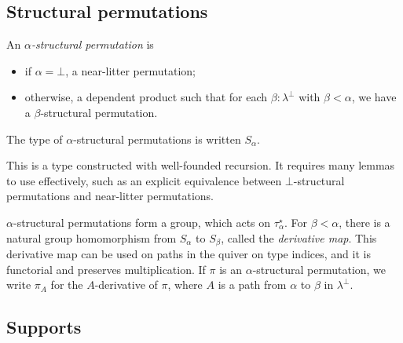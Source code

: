 \documentclass{article}
\begin{document}
\subsection{Structural permutations}

\begin{definition}
    An \emph{\( \alpha \)-structural permutation} is
    \begin{itemize}
        \item if \( \alpha = \bot \), a near-litter permutation;
        \item otherwise, a dependent product such that for each \( \beta : \lambda^\bot \) with \( \beta < \alpha \), we have a \( \beta \)-structural permutation.
    \end{itemize}
    The type of \( \alpha \)-structural permutations is written \( S_\alpha \).
\end{definition}
\begin{remark}
    This is a type constructed with well-founded recursion.
    It requires many lemmas to use effectively, such as an explicit equivalence between \( \bot \)-structural permutations and near-litter permutations.
\end{remark}
\begin{lemma}
    \( \alpha \)-structural permutations form a group, which acts on \( \tau_\alpha^\star \).
    For \( \beta < \alpha \), there is a natural group homomorphism from \( S_\alpha \) to \( S_\beta \), called the \emph{derivative map}.
    This derivative map can be used on paths in the quiver on type indices, and it is functorial and preserves multiplication.
    If \( \pi \) is an \( \alpha \)-structural permutation, we write \( \pi_A \) for the \( A \)-derivative of \( \pi \), where \( A \) is a path from \( \alpha \) to \( \beta \) in \( \lambda^\bot \).
\end{lemma}

\subsection{Supports}
\end{document}
